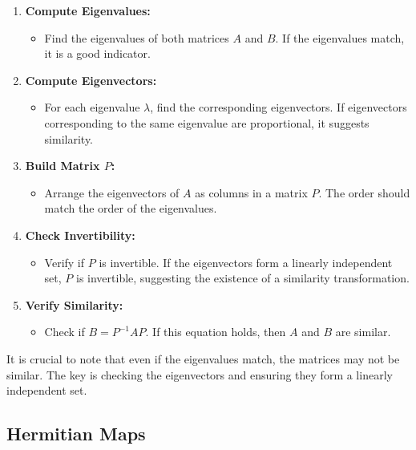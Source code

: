 \begin{enumerate}
    \item \textbf{Compute Eigenvalues:}
    \begin{itemize}
        \item Find the eigenvalues of both matrices $A$ and $B$. If the eigenvalues match, it is a good indicator.
    \end{itemize}

    \item \textbf{Compute Eigenvectors:}
    \begin{itemize}
        \item For each eigenvalue $\lambda$, find the corresponding eigenvectors. If eigenvectors corresponding to the same eigenvalue are proportional, it suggests similarity.
    \end{itemize}

    \item \textbf{Build Matrix $P$:}
    \begin{itemize}
        \item Arrange the eigenvectors of $A$ as columns in a matrix $P$. The order should match the order of the eigenvalues.
    \end{itemize}

    \item \textbf{Check Invertibility:}
    \begin{itemize}
        \item Verify if $P$ is invertible. If the eigenvectors form a linearly independent set, $P$ is invertible, suggesting the existence of a similarity transformation.
    \end{itemize}

    \item \textbf{Verify Similarity:}
    \begin{itemize}
        \item Check if $B = P^{-1}AP$. If this equation holds, then $A$ and $B$ are similar.
    \end{itemize}
\end{enumerate}

It is crucial to note that even if the eigenvalues match, the matrices may not be similar. The key is checking the eigenvectors and ensuring they form a linearly independent set.

\subsection{Hermitian Maps}

